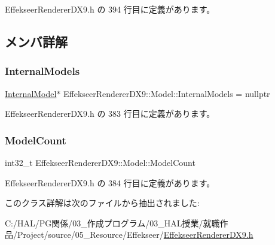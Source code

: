  Effekseer\+Renderer\+D\+X9.\+h の 394 行目に定義があります。



\subsection{メンバ詳解}
\mbox{\label{class_effekseer_renderer_d_x9_1_1_model_a712d95cfe8c2223a708038c7132e60f5}} 
\subsubsection{\texorpdfstring{Internal\+Models}{InternalModels}}
{\footnotesize\ttfamily \mbox{\hyperlink{struct_effekseer_renderer_d_x9_1_1_model_1_1_internal_model}{Internal\+Model}}$\ast$ Effekseer\+Renderer\+D\+X9\+::\+Model\+::\+Internal\+Models = nullptr}



 Effekseer\+Renderer\+D\+X9.\+h の 383 行目に定義があります。

\mbox{\label{class_effekseer_renderer_d_x9_1_1_model_a993f041558265db631654723ca973e0a}} 
\subsubsection{\texorpdfstring{Model\+Count}{ModelCount}}
{\footnotesize\ttfamily int32\+\_\+t Effekseer\+Renderer\+D\+X9\+::\+Model\+::\+Model\+Count}



 Effekseer\+Renderer\+D\+X9.\+h の 384 行目に定義があります。



このクラス詳解は次のファイルから抽出されました\+:\begin{DoxyCompactItemize}
\item 
C\+:/\+H\+A\+L/\+P\+G関係/03\+\_\+作成プログラム/03\+\_\+\+H\+A\+L授業/就職作品/\+Project/source/05\+\_\+\+Resource/\+Effekseer/\mbox{\hyperlink{_effekseer_renderer_d_x9_8h}{Effekseer\+Renderer\+D\+X9.\+h}}\end{DoxyCompactItemize}
